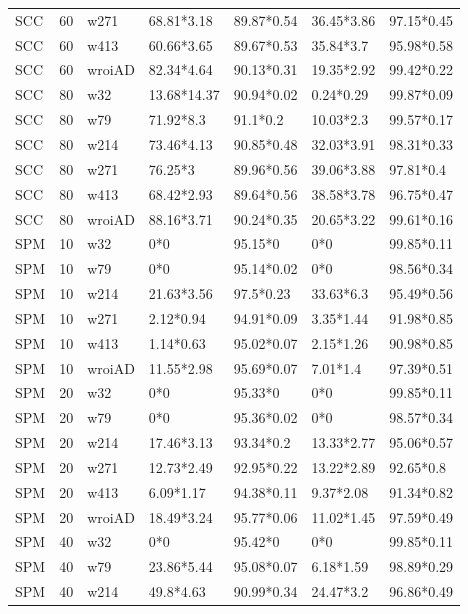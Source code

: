 \begin{table}[ht]
\begin{tabular}{lllllll}
  SCC & 60 & w271 & 68.81*3.18 & 89.87*0.54 & 36.45*3.86 & 97.15*0.45 \\ 
  SCC & 60 & w413 & 60.66*3.65 & 89.67*0.53 & 35.84*3.7 & 95.98*0.58 \\ 
  SCC & 60 & wroiAD & 82.34*4.64 & 90.13*0.31 & 19.35*2.92 & 99.42*0.22 \\ 
  SCC & 80 & w32 & 13.68*14.37 & 90.94*0.02 & 0.24*0.29 & 99.87*0.09 \\ 
  SCC & 80 & w79 & 71.92*8.3 & 91.1*0.2 & 10.03*2.3 & 99.57*0.17 \\ 
  SCC & 80 & w214 & 73.46*4.13 & 90.85*0.48 & 32.03*3.91 & 98.31*0.33 \\ 
  SCC & 80 & w271 & 76.25*3 & 89.96*0.56 & 39.06*3.88 & 97.81*0.4 \\ 
  SCC & 80 & w413 & 68.42*2.93 & 89.64*0.56 & 38.58*3.78 & 96.75*0.47 \\ 
  SCC & 80 & wroiAD & 88.16*3.71 & 90.24*0.35 & 20.65*3.22 & 99.61*0.16 \\ 
  SPM & 10 & w32 & 0*0 & 95.15*0 & 0*0 & 99.85*0.11 \\ 
  SPM & 10 & w79 & 0*0 & 95.14*0.02 & 0*0 & 98.56*0.34 \\ 
  SPM & 10 & w214 & 21.63*3.56 & 97.5*0.23 & 33.63*6.3 & 95.49*0.56 \\ 
  SPM & 10 & w271 & 2.12*0.94 & 94.91*0.09 & 3.35*1.44 & 91.98*0.85 \\ 
  SPM & 10 & w413 & 1.14*0.63 & 95.02*0.07 & 2.15*1.26 & 90.98*0.85 \\ 
  SPM & 10 & wroiAD & 11.55*2.98 & 95.69*0.07 & 7.01*1.4 & 97.39*0.51 \\ 
  SPM & 20 & w32 & 0*0 & 95.33*0 & 0*0 & 99.85*0.11 \\ 
  SPM & 20 & w79 & 0*0 & 95.36*0.02 & 0*0 & 98.57*0.34 \\ 
  SPM & 20 & w214 & 17.46*3.13 & 93.34*0.2 & 13.33*2.77 & 95.06*0.57 \\ 
  SPM & 20 & w271 & 12.73*2.49 & 92.95*0.22 & 13.22*2.89 & 92.65*0.8 \\ 
  SPM & 20 & w413 & 6.09*1.17 & 94.38*0.11 & 9.37*2.08 & 91.34*0.82 \\ 
  SPM & 20 & wroiAD & 18.49*3.24 & 95.77*0.06 & 11.02*1.45 & 97.59*0.49 \\ 
  SPM & 40 & w32 & 0*0 & 95.42*0 & 0*0 & 99.85*0.11 \\ 
  SPM & 40 & w79 & 23.86*5.44 & 95.08*0.07 & 6.18*1.59 & 98.89*0.29 \\ 
  SPM & 40 & w214 & 49.8*4.63 & 90.99*0.34 & 24.47*3.2 & 96.86*0.49 \\ 

\end{tabular}
\end{table}
